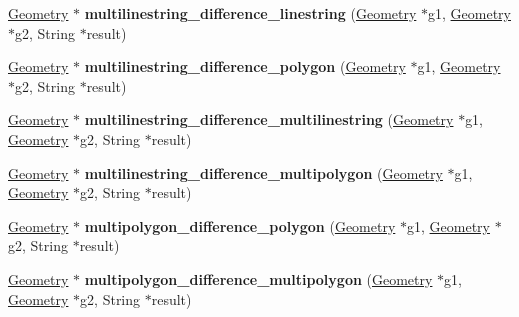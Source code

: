 \begin{DoxyCompactItemize}
\item 
\mbox{\label{classBG__setop__wrapper_ac0f32396463c207015dc50049362e4d0}} 
\mbox{\hyperlink{classGeometry}{Geometry}} $\ast$ {\bfseries multilinestring\+\_\+difference\+\_\+linestring} (\mbox{\hyperlink{classGeometry}{Geometry}} $\ast$g1, \mbox{\hyperlink{classGeometry}{Geometry}} $\ast$g2, String $\ast$result)
\item 
\mbox{\label{classBG__setop__wrapper_aa6f78c66859c65f1cd75b6e8630ac8f7}} 
\mbox{\hyperlink{classGeometry}{Geometry}} $\ast$ {\bfseries multilinestring\+\_\+difference\+\_\+polygon} (\mbox{\hyperlink{classGeometry}{Geometry}} $\ast$g1, \mbox{\hyperlink{classGeometry}{Geometry}} $\ast$g2, String $\ast$result)
\item 
\mbox{\label{classBG__setop__wrapper_a55fe9578f58cd03d08d88b0845495918}} 
\mbox{\hyperlink{classGeometry}{Geometry}} $\ast$ {\bfseries multilinestring\+\_\+difference\+\_\+multilinestring} (\mbox{\hyperlink{classGeometry}{Geometry}} $\ast$g1, \mbox{\hyperlink{classGeometry}{Geometry}} $\ast$g2, String $\ast$result)
\item 
\mbox{\label{classBG__setop__wrapper_a6a426dc2f0acd888fa66417689417a39}} 
\mbox{\hyperlink{classGeometry}{Geometry}} $\ast$ {\bfseries multilinestring\+\_\+difference\+\_\+multipolygon} (\mbox{\hyperlink{classGeometry}{Geometry}} $\ast$g1, \mbox{\hyperlink{classGeometry}{Geometry}} $\ast$g2, String $\ast$result)
\item 
\mbox{\label{classBG__setop__wrapper_a55ce888e9906263f9b17b24c7b143026}} 
\mbox{\hyperlink{classGeometry}{Geometry}} $\ast$ {\bfseries multipolygon\+\_\+difference\+\_\+polygon} (\mbox{\hyperlink{classGeometry}{Geometry}} $\ast$g1, \mbox{\hyperlink{classGeometry}{Geometry}} $\ast$g2, String $\ast$result)
\item 
\mbox{\label{classBG__setop__wrapper_ac04226ca85203f9f09b3be855dc981b0}} 
\mbox{\hyperlink{classGeometry}{Geometry}} $\ast$ {\bfseries multipolygon\+\_\+difference\+\_\+multipolygon} (\mbox{\hyperlink{classGeometry}{Geometry}} $\ast$g1, \mbox{\hyperlink{classGeometry}{Geometry}} $\ast$g2, String $\ast$result)
\item 

\end{DoxyCompactItemize}
